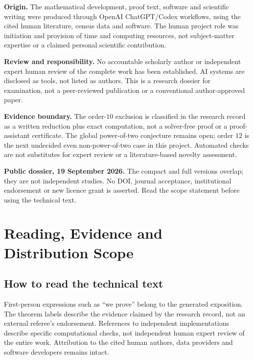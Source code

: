 \thispagestyle{empty}
\vspace{1.1cm}
\vspace{0.45cm}
\noindent{\Large \DossierVariant\par}
\vspace{0.7cm}
\vspace{0.8cm}

\noindent\textbf{Origin.}
The mathematical development, proof text, software and scientific writing
were produced through OpenAI ChatGPT/Codex workflows, using the cited human
literature, census data and software. The human project role was initiation
and provision of time and computing resources, not subject-matter expertise
or a claimed personal scientific contribution.

\medskip
\noindent\textbf{Review and responsibility.}
No accountable scholarly author or independent expert human review of the
complete work has been established. AI systems are disclosed as tools, not
listed as authors. This is a research dossier for examination, not a
peer-reviewed publication or a conventional author-approved paper.

\medskip
\noindent\textbf{Evidence boundary.}
The order-$10$ exclusion is classified in the research record as a written
reduction plus exact computation, not a solver-free proof or a
proof-assistant certificate. The global power-of-two conjecture remains
open; order $12$ is the next undecided even non-power-of-two case in this
project. Automated checks are not substitutes for expert review or a
literature-based novelty assessment.

\vfill
\noindent\textbf{Public dossier, 19 September 2026.}
The compact and full versions overlap; they are not independent studies.
No DOI, journal acceptance, institutional endorsement or new licence grant
is asserted. Read the scope statement before using the technical text.
\clearpage

\section*{Reading, Evidence and Distribution Scope}
\subsection*{How to read the technical text}
First-person expressions such as ``we prove'' belong to the generated
exposition. The theorem labels describe the evidence claimed by the research
record, not an external referee's endorsement. References to independent
implementations describe specific computational checks, not independent
human expert review of the entire work. Attribution to the cited human
authors, data providers and software developers remains intact.

